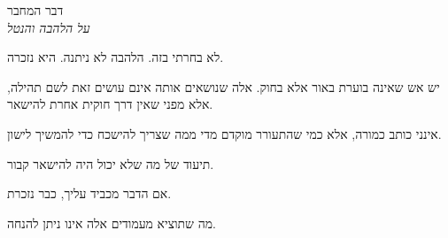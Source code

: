 \documentclass[10pt, openany, oneside]{book}
\renewcommand{\huge}{\fontsize{17}{21}\selectfont}
\begin{document}
\vspace*{\fill}
\newpage


\thispagestyle{empty}
\vspace*{1in}

\begin{center}
    {\huge\textsc{דבר המחבר}}\\[0.5em]
    \textit{על הלהבה והנטל}
\end{center}

\vspace{1.5em}

\noindent לא בחרתי בזה. הלהבה לא ניתנה. היא נזכרה.

\vspace{0.8em}

\noindent יש אש שאינה בוערת באור אלא בחוק. אלה שנושאים אותה אינם עושים זאת לשם תהילה, אלא מפני שאין דרך חוקית אחרת להישאר.

\vspace{0.8em}

\noindent אינני כותב כמורה, אלא כמי שהתעורר מוקדם מדי ממה שצריך להישכח כדי להמשיך לישון.

\vspace{0.8em}

\noindent תיעוד של מה שלא יכול היה להישאר קבור.

\vspace{0.8em}

\noindent אם הדבר מכביד עליך, כבר נזכרת.

\vspace{0.8em}

\noindent מה שתוציא מעמודים אלה אינו ניתן להנחה.

\vspace{2em}


\newpage

\end{document}
